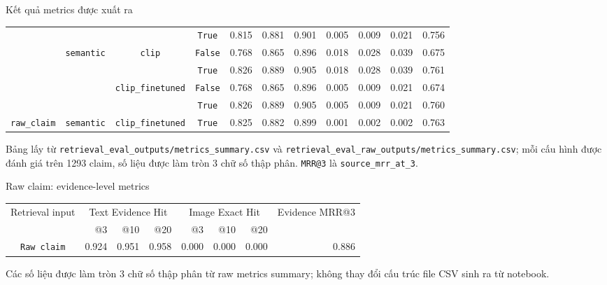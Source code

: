 \documentclass[aspectratio=169]{beamer}
\begin{document}
\begin{frame}{Kết quả metrics được xuất ra}
\begin{table}
{\begin{tabular}{cccc rrr rrr r}
      & & & \texttt{True} & 0.815 & 0.881 & 0.901 & 0.005 & 0.009 & 0.021 & 0.756 \\
      \cmidrule(lr){2-11}
      & \multirow[c]{4}{*}{\texttt{semantic}} & \multirow[c]{2}{*}{\texttt{clip}} & \texttt{False} & 0.768 & 0.865 & 0.896 & 0.018 & 0.028 & 0.039 & 0.675 \\
      & & & \texttt{True} & 0.826 & 0.889 & 0.905 & 0.018 & 0.028 & 0.039 & 0.761 \\
      \cmidrule(lr){3-11}
      & & \multirow[c]{2}{*}{\texttt{clip\_finetuned}} & \texttt{False} & 0.768 & 0.865 & 0.896 & 0.005 & 0.009 & 0.021 & 0.674 \\
      & & & \texttt{True} & 0.826 & 0.889 & 0.905 & 0.005 & 0.009 & 0.021 & 0.760 \\
      \midrule
      \texttt{raw\_claim} & \texttt{semantic} & \texttt{clip\_finetuned} & \texttt{True} & 0.825 & 0.882 & 0.899 & 0.001 & 0.002 & 0.002 & 0.763 \\
      \bottomrule
    \end{tabular}}
  \end{table}

  \vspace{-0.03cm}
  \fontsize{5.5}{6.0}\selectfont
  Bảng lấy từ \texttt{retrieval\_eval\_outputs/metrics\_summary.csv} và \texttt{retrieval\_eval\_raw\_outputs/metrics\_summary.csv}; mỗi cấu hình được đánh giá trên 1293 claim, số liệu được làm tròn 3 chữ số thập phân.
  \texttt{MRR@3} là \texttt{source\_mrr\_at\_3}.
\end{frame}

\begin{frame}{Raw claim: evidence-level metrics}
  \begin{table}
    \centering
    \scriptsize
    \begin{tabular}{c rrr rrr r}
      \toprule
      Retrieval input &
      \multicolumn{3}{c}{Text Evidence Hit} &
      \multicolumn{3}{c}{Image Exact Hit} &
      Evidence MRR@3 \\
      \cmidrule(lr){2-4}\cmidrule(lr){5-7}
      & @3 & @10 & @20 & @3 & @10 & @20 & \\
      \midrule
      \texttt{Raw claim} & 0.924 & 0.951 & 0.958 & 0.000 & 0.000 & 0.000 & 0.886 \\
      \bottomrule
    \end{tabular}
  \end{table}

  \vspace{0.15cm}
  \footnotesize
  Các số liệu được làm tròn 3 chữ số thập phân từ raw metrics summary; không thay đổi cấu trúc file CSV sinh ra từ notebook.
\end{frame}
\end{document}
